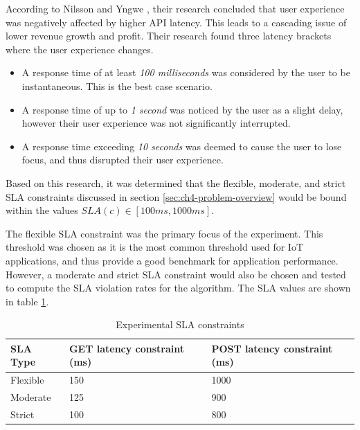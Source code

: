 According to Nilsson and Yngwe \cite{nilsson2022api}, their research concluded that user experience was negatively affected by higher API latency. This leads to a cascading issue of lower revenue growth and profit. Their research found three latency brackets where the user experience changes.

\begin{itemize}
    \item A response time of at least \textit{100 milliseconds} was considered by the user to be instantaneous. This is the best case scenario.
    \item A response time of up to \textit{1 second} was noticed by the user as a slight delay, however their user experience was not significantly interrupted.
    \item A response time exceeding \textit{10 seconds} was deemed to cause the user to lose focus, and thus disrupted their user experience.
\end{itemize}

Based on this research, it was determined that the flexible, moderate, and strict SLA constraints discussed in section \ref{sec:ch4-problem-overview} would be bound within the values $SLA(c) \in [100ms, 1000ms]$.\par

The flexible SLA constraint was the primary focus of the experiment. This threshold was chosen as it is the most common threshold used for IoT applications, and thus provide a good benchmark for application performance. However, a moderate and strict SLA constraint would also be chosen and tested to compute the SLA violation rates for the algorithm. The SLA values are shown in table \ref{tab:experiment-sla-values}.\par

\begin{table}
    \caption{Experimental SLA constraints}\label{tab:experiment-sla-values}
    \centering
    \begin{tabular}{|l|l|l|}
        \hline
        SLA Type & GET latency constraint (ms) & POST latency constraint (ms)\\
        \hline
        Flexible    & 150   & 1000\\
        Moderate    & 125   & 900\\
        Strict      & 100   & 800\\
        \hline
    \end{tabular}
\end{table}

